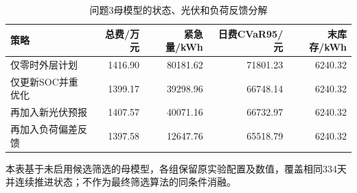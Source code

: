 \begin{table}[htbp]\centering\small
\caption{问题3母模型的状态、光伏和负荷反馈分解}
\label{tab:v2_feedback}
\begin{tabularx}{\linewidth}{LRRRR}\toprule
策略 & 总费/万元 & 紧急量/kWh & 日费CVaR95/元 & 末库存/kWh\\\midrule
仅零时外层计划 & 1416.90 & 80181.62 & 71801.23 & 6240.32\\
仅更新SOC并重优化 & 1399.17 & 39298.96 & 66748.14 & 6240.32\\
再加入新光伏预报 & 1407.57 & 40071.16 & 66732.97 & 6240.32\\
再加入负荷偏差反馈 & 1397.58 & 12647.76 & 65518.79 & 6240.32\\
\bottomrule\end{tabularx}
\par\smallskip\parbox{\linewidth}{\footnotesize 本表基于未启用候选筛选的母模型，各组保留原实验配置及数值，覆盖相同334天并连续推进状态；不作为最终筛选算法的同条件消融。}
\end{table}
